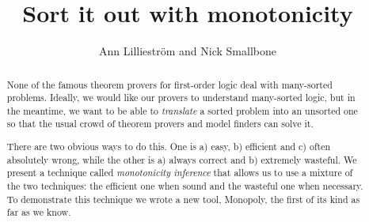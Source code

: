 \documentclass{llncs}
\title{Sort it out with monotonicity}
\author{Ann Lilliestr\"om and Nick Smallbone}
\institute{Chalmers University of Technology}
\begin{document}
\maketitle

\begin{abstract}
None of the famous theorem provers for first-order logic deal with
many-sorted problems. Ideally, we would like our provers to understand
many-sorted logic, but in the meantime, we want to be able to
\emph{translate} a sorted problem into an unsorted one so that the
usual crowd of theorem provers and model finders can solve it.

There are two obvious ways to do this. One is a) easy, b) efficient
and c) often absolutely wrong, while the other is a) always correct
and b) extremely wasteful. We present a technique called
\emph{monotonicity inference} that allows us to use a mixture of the
two techniques: the efficient one when sound and the wasteful one when
necessary. To demonstrate this technique we wrote a new tool,
Monopoly, the first of its kind as far as we know.
\end{abstract}







 
\end{document}
